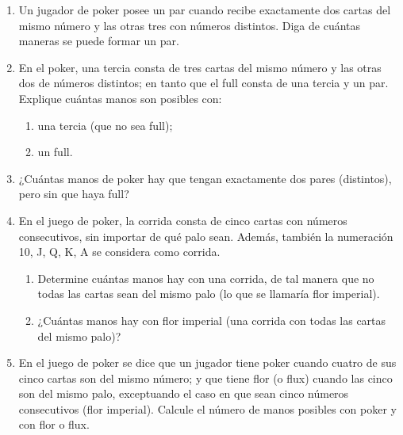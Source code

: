 \begin{Ejer}
\begin{enumerate}
\item Un jugador de poker posee un par cuando recibe exactamente dos cartas del mismo n\'umero y las otras tres con n\'umeros distintos. Diga de cu\'antas maneras se puede formar un par.

\item En el poker, una tercia consta de tres cartas del mismo n\'umero y las otras dos de n\'umeros distintos; en tanto que el full consta de una tercia y un par. Explique cu\'antas manos son posibles con:
\begin{enumerate}
\item una tercia (que no sea full);
\item un full.
\end{enumerate}

\item ¿Cu\'antas manos de poker hay que tengan exactamente dos pares (distintos), pero sin que haya full?

\item En el juego de poker, la corrida consta de cinco cartas con n\'umeros consecutivos, sin importar de qu\'e palo sean. Adem\'as, tambi\'en la numeraci\'on 10, J, Q, K, A se considera como corrida.
\begin{enumerate}
\item Determine cu\'antas manos hay con una corrida, de tal manera que no todas las cartas sean del mismo palo (lo que se llamar\'ia flor imperial).
\item ¿Cu\'antas manos hay con flor imperial (una corrida con todas las cartas del mismo palo)?
\end{enumerate}

\item En el juego de poker se dice que un jugador tiene poker cuando cuatro de sus cinco cartas son del mismo n\'umero; y que tiene flor (o flux) cuando las cinco son del mismo palo, exceptuando el caso en que sean cinco n\'umeros consecutivos (flor imperial). Calcule el n\'umero de manos posibles con poker y con flor o flux.




\end{enumerate}
\end{Ejer}

